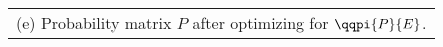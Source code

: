 \scriptsize
\begin{tabular}[t]{l}
	(e) Probability matrix $P$ after optimizing for $\qqpi{P}{E}$.
\end{tabular}